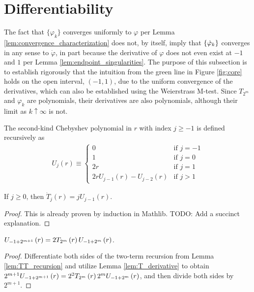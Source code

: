 \section{Differentiability}\label{sec:Differentiability}

The fact that $\{\varphi_k\}$ converges uniformly to $\varphi$ per Lemma \ref{lem:convergence_characterization} does not, by itself, imply that $\{\dotvarphi{k}\}$ converges in any sense to $\dot{\varphi}$, in part because the derivative of $\varphi$ does not even exist at $-1$ and $1$ per Lemma \ref{lem:endpoint_singularities}. The purpose of this subsection is to establish rigorously that the intuition from the green line in Figure \ref{fig:core} holds on the open interval, $\left(-1,1\right)$, due to the uniform convergence of the derivatives, which can also be established using the Weierstrass M-test. Since $T_{2^m}$ and $\varphi_k$ are polynomials, their derivatives are also polynomials, although their limit as $k \uparrow \infty$ is not.

\begin{definition}
  \label{def:U}
  \leanok
  The second-kind Chebyshev polynomial in $r$ with index $j \geq -1$ is defined recursively as
  \begin{align*}
U_j\left(r\right) \equiv 
\begin{cases}
0 & \text{if } j = -1 \\
1 & \text{if } j = 0 \\
2r & \text{if } j = 1 \\
2 r U_{j - 1}\left(r\right) - U_{j - 2}\left(r\right) & \text{if } j > 1
\end{cases}
  \end{align*}
\end{definition}

\begin{lemma}[]
  \label{lem:T_derivative}
  \leanok
  If $j \geq 0$, then $\dot{T}_j\left(r\right) = j U_{j - 1}\left(r\right)$.
\end{lemma}
\begin{proof}
  \leanok
  This is already proven by induction in Mathlib. TODO: Add a succinct explanation.
\end{proof}

\begin{lemma}
  \label{lem:U_composition}
  $U_{-1 + 2^{m + 1}}\left(r\right) = 2 \TT[r]{m} U_{-1 + 2^m}\left(r\right)$.
\end{lemma}
\begin{proof}
  Differentiate both sides of the two-term recursion from Lemma \ref{lem:TT_recursion} and utilize Lemma \ref{lem:T_derivative} to obtain $2^{m + 1} U_{-1 + 2^{m + 1}}\left(r\right) = 2^2\TT[r]{m} 2^m U_{-1 + 2^m}\left(r\right)$, and then divide both sides by $2^{m + 1}$.
\end{proof}

